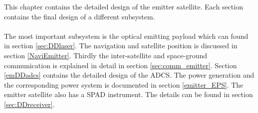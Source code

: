 This chapter contains the detailed design of the emitter satellite. Each section contains the final design of a different subsystem. 
\\\\
The most important subsystem is the optical emitting payload which can found in section \ref{sec:DDlaser}. The navigation and satellite position is discussed in section \ref{NaviEmitter}. Thirdly the inter-satellite and space-ground communication is explained in detail in section \ref{sec:comm_emitter}. Section \ref{emDDadcs} contains the detailed design of the \ac{ADCS}. The power generation and the corresponding power system is documented in section \ref{emitter_EPS}. The emitter satellite also has a \ac{SPAD} instrument. The details can be found in section \ref{sec:DDreceiver}.